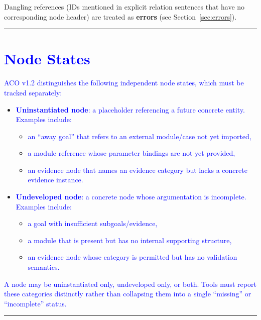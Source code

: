\documentclass[11pt,twoside,a4paper]{article}
\begin{document}
Dangling references (IDs mentioned in explicit relation sentences that have no corresponding node header) are treated as \textbf{errors} (see Section~\ref{sec:errors}).


\bigskip
\hrule
\bigskip


\section{\textcolor{blue}{Node States}}

\textcolor{blue}{ACO v1.2 distinguishes the following independent node states, which must be tracked separately:}

\begin{itemize}[leftmargin=2em]
  \item \textcolor{blue}{\textbf{Uninstantiated node}: a placeholder referencing a future concrete entity. Examples include:}
  \begin{itemize}[leftmargin=1.5em]
    \item \textcolor{blue}{an ``away goal'' that refers to an external module/case not yet imported,}
    \item \textcolor{blue}{a module reference whose parameter bindings are not yet provided,}
    \item \textcolor{blue}{an evidence node that names an evidence category but lacks a concrete evidence instance.}
  \end{itemize}

  \item \textcolor{blue}{\textbf{Undeveloped node}: a concrete node whose argumentation is incomplete. Examples include:}
  \begin{itemize}[leftmargin=1.5em]
    \item \textcolor{blue}{a goal with insufficient subgoals/evidence,}
    \item \textcolor{blue}{a module that is present but has no internal supporting structure,}
    \item \textcolor{blue}{an evidence node whose category is permitted but has no validation semantics.}
  \end{itemize}
\end{itemize}

\textcolor{blue}{A node may be uninstantiated only, undeveloped only, or both. Tools must report these categories distinctly rather than collapsing them into a single ``missing'' or ``incomplete'' status.}


\bigskip
\hrule
\bigskip
\end{document}
